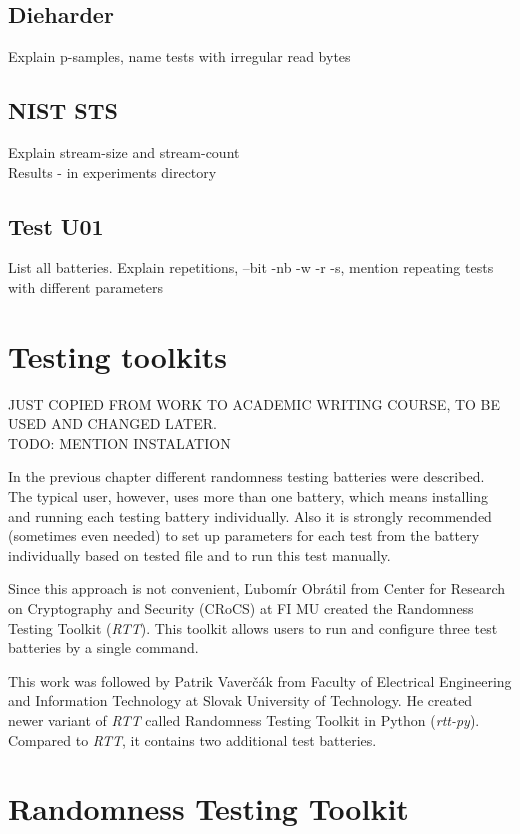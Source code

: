 \documentclass[
  digital,     %
  oneside,     %
  nosansbold,  %
  nocolorbold, %
  nolof,         %
  nolot,         %
]{fithesis4}
\begin{document}
\subsection{Dieharder}
Explain p-samples, name tests with irregular read bytes
\subsection{NIST STS}
Explain stream-size and stream-count\\
Results - in experiments directory

\subsection{Test U01}
List all batteries.
Explain repetitions, --bit -nb -w -r -s, mention repeating tests with different parameters


\section{Testing toolkits}\label{analysis}
JUST COPIED FROM WORK TO ACADEMIC WRITING COURSE, TO BE USED AND CHANGED LATER.\\

TODO: MENTION INSTALATION



In the previous chapter different randomness testing batteries were described. The typical user, however, uses more than one battery, which means installing and running each testing battery individually. Also it is strongly recommended (sometimes even needed) to set up parameters for each test from the battery individually based on tested file and to run this test manually.

Since this approach is not convenient, Ľubomír Obrátil from Center for Research on Cryptography and Security (CRoCS) at FI MU created the Randomness Testing Toolkit (\emph{RTT}). This toolkit allows users to run and configure three test batteries by a single command.

This work was followed by Patrik Vaverčák from Faculty of Electrical Engineering and Information Technology at Slovak University of Technology. He created newer variant of \emph{RTT} called Randomness Testing Toolkit in Python (\emph{rtt-py}). Compared to \emph{RTT}, it contains two additional test batteries. 

\section{Randomness Testing Toolkit}
\end{document}
